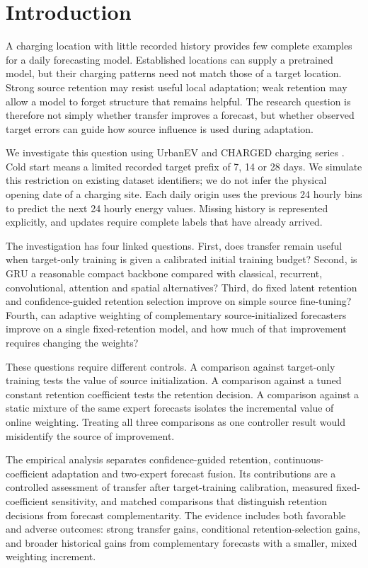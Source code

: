 \documentclass[pdflatex,iicol,sn-mathphys-num]{sn-jnl}
\begin{document}
\section{Introduction}
A charging location with little recorded history provides few complete examples for a daily forecasting model. Established locations can supply a pretrained model, but their charging patterns need not match those of a target location. Strong source retention may resist useful local adaptation; weak retention may allow a model to forget structure that remains helpful. The research question is therefore not simply whether transfer improves a forecast, but whether observed target errors can guide how source influence is used during adaptation.

We investigate this question using UrbanEV and CHARGED charging series \cite{urbanev2025,charged2025}. Cold start means a limited recorded target prefix of 7, 14 or 28 days. We simulate this restriction on existing dataset identifiers; we do not infer the physical opening date of a charging site. Each daily origin uses the previous 24 hourly bins to predict the next 24 hourly energy values. Missing history is represented explicitly, and updates require complete labels that have already arrived.

The investigation has four linked questions. First, does transfer remain useful when target-only training is given a calibrated initial training budget? Second, is GRU a reasonable compact backbone compared with classical, recurrent, convolutional, attention and spatial alternatives? Third, do fixed latent retention and confidence-guided retention selection improve on simple source fine-tuning? Fourth, can adaptive weighting of complementary source-initialized forecasters improve on a single fixed-retention model, and how much of that improvement requires changing the weights?

These questions require different controls. A comparison against target-only training tests the value of source initialization. A comparison against a tuned constant retention coefficient tests the retention decision. A comparison against a static mixture of the same expert forecasts isolates the incremental value of online weighting. Treating all three comparisons as one controller result would misidentify the source of improvement.

The empirical analysis separates confidence-guided retention, continuous-coefficient adaptation and two-expert forecast fusion. Its contributions are a controlled assessment of transfer after target-training calibration, measured fixed-coefficient sensitivity, and matched comparisons that distinguish retention decisions from forecast complementarity. The evidence includes both favorable and adverse outcomes: strong transfer gains, conditional retention-selection gains, and broader historical gains from complementary forecasts with a smaller, mixed weighting increment.
\end{document}
